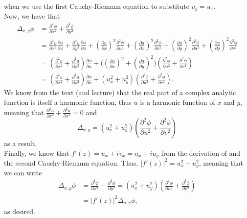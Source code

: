 \documentclass{article}
\begin{document}
when we use the first Cauchy-Riemann equation to substitute $v_y=u_x$. \\
Now, we have that
\begin{equation*}
\begin{split}
    \Delta_{x,y}\phi&=
    \frac{\partial^2\phi}{\partial x^2}+\frac{\partial^2\phi}{\partial y^2}\\&=
    \frac{\partial^2 u}{\partial x^2}\frac{\partial \phi}{\partial u}+\frac{\partial^2 u}{\partial y^2}\frac{\partial \phi}{\partial u}+(\frac{\partial u}{\partial x})^2\frac{\partial^2 \phi}{\partial u^2}+(\frac{\partial u}{\partial x})^2\frac{\partial^2 \phi}{\partial v^2}+(\frac{\partial u}{\partial y})^2\frac{\partial^2 \phi}{\partial u^2}+(\frac{\partial u}{\partial y})^2\frac{\partial^2 \phi}{\partial v^2}\\&=
    (\frac{\partial^2 u}{\partial x^2}+\frac{\partial^2 u}{\partial x^2})\frac{\partial \phi}{\partial u}+\bigg((\frac{\partial u}{\partial x})^2+(\frac{\partial u}{\partial y})^2\bigg)(\frac{\partial^2 \phi}{\partial u^2}+\frac{\partial^2 \phi}{\partial v^2})\\&=
    (\frac{\partial^2 u}{\partial x^2}+\frac{\partial^2 u}{\partial x^2})\frac{\partial \phi}{\partial u}+(u_x^2+u_y^2)(\frac{\partial^2 \phi}{\partial u^2}+\frac{\partial^2 \phi}{\partial v^2}).
\end{split}
\end{equation*}
We know from the text (and lecture) that the real part of a complex analytic function is itself a harmonic function, thus $u$ is a harmonic function of $x$ and $y$, meaning that $\frac{\partial^2 u}{\partial x^2}+\frac{\partial^2 u}{\partial x^2}=0$ and
\begin{equation*}
    \Delta_{x,y}=(u_x^2+u_y^2)(\frac{\partial^2 \phi}{\partial u^2}+\frac{\partial^2 \phi}{\partial v^2})
\end{equation*}
as a result. \\
Finally, we know that $f'(z)=u_x+i v_x = u_x-i u_y$ from the derivation of and the second Cauchy-Riemann equation. Thus, $|f'(z)|^2=u_x^2+u_y^2$, meaning that we can write
\begin{equation*}
\begin{split}
    \Delta_{x,y}\phi&=
    \frac{\partial^2\phi}{\partial x^2}+\frac{\partial^2\phi}{\partial y^2}=(u_x^2+u_y^2)(\frac{\partial^2 \phi}{\partial u^2}+\frac{\partial^2 \phi}{\partial v^2})\\&=
    |f'(z)|^2\Delta_{u,v}\phi,
\end{split}
\end{equation*}
as desired.
\end{document}

